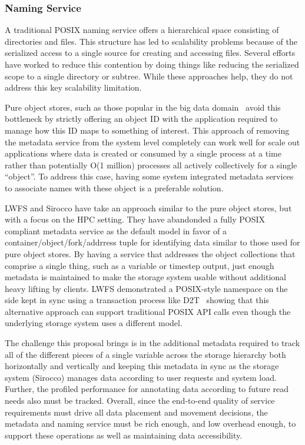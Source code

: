 \subsubsection{Naming Service}

A traditional POSIX naming service offers a hierarchical space consisting of
directories and files. This structure has led to scalability problems because
of the serialized access to a single source for creating and accessing files.
Several efforts~\cite{giga+,pvfs,others} have worked to reduce this contention
by doing things like reducing the serialized scope to a single directory or
subtree. While these approaches help, they do not address this key scalability
limitation.

Pure object stores, such as those popular in the big data
domain~\cite{memcached,others} avoid this bottleneck by strictly offering an
object ID with the application required to manage how this ID maps to something
of interest. This approach of removing the metadata service from the system
level completely can work well for scale out applications where data is created
or consumed by a single process at a time rather than potentially O(1 million)
processes all actively collectively for a single ``object''. To address this
case, having some system integrated metadata services to associate names with
these object is a preferable solution.

LWFS and Sirocco have take an approach similar to the pure object stores, but
with a focus on the HPC setting. They have abandonded a fully POSIX compliant
metadata service as the default model in favor of a
container/object/fork/addrress tuple for identifying data similar to those
used for pure object stores. By having a service that addresses the object
collections that comprise a single thing, such as a variable or timestep
output, just enough metadata is maintained to make the storage system usable
without additional heavy lifting by clients.  LWFS demonstrated a POSIX-style
namespace on the side kept in sync using a transaction process like
D2T~\cite{d2t} showing that this alternative approach can support traditional
POSIX API calls even though the underlying storage system uses a different
model.

The challenge this proposal brings is in the additional metadata required to
track all of the different pieces of a single variable across the storage
hierarchy both horizontally and vertically and keeping this metadata in sync
as the storage system (Sirocco) manages data according to user requests and
system load. Further, the profiled performance for annotating data according to
future read needs also must be tracked. Overall, since the end-to-end quality
of service requirements must drive all data placement and movement decisions,
the metadata and naming service must be rich enough, and low overhead enough,
to support these operations as well as maintaining data accessibility.

